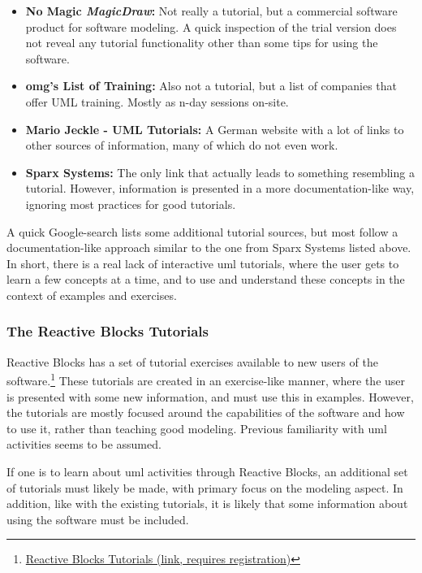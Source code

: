 \begin{itemize}
	\item{\textbf{No Magic \emph{MagicDraw}:}} Not really a tutorial, but a commercial software product for software modeling. A quick inspection of the trial version does not reveal any tutorial functionality other than some tips for using the software.
	\item{\textbf{\gls{omg}'s List of Training:}} Also not a tutorial, but a list of companies that offer UML training. Mostly as n-day sessions on-site.
	\item{\textbf{Mario Jeckle - UML Tutorials:}} A German website with a lot of links to other sources of information, many of which do not even work.
	\item{\textbf{Sparx Systems:}} The only link that actually leads to something resembling a tutorial. However, information is presented in a more documentation-like way, ignoring most practices for good tutorials.
\end{itemize}

\noindent
A quick Google-search lists some additional tutorial sources, but most follow a documentation-like approach similar to the one from Sparx Systems listed above. In short, there is a real lack of interactive \gls{uml} tutorials, where the user gets to learn a few concepts at a time, and to use and understand these concepts in the context of examples and exercises.

\subsubsection{The Reactive Blocks Tutorials}
Reactive Blocks has a set of tutorial exercises available to new users of the software.\footnote{\href{http://reference.bitreactive.com/tutorials/}{Reactive Blocks Tutorials (link, requires registration)}} These tutorials are created in an exercise-like manner, where the user is presented with some new information, and must use this in examples. However, the tutorials are mostly focused around the capabilities of the software and how to use it, rather than teaching good modeling. Previous familiarity with \gls{uml} activities seems to be assumed.

\noindent
If one is to learn about \gls{uml} activities through Reactive Blocks, an additional set of tutorials must likely be made, with primary focus on the modeling aspect. In addition, like with the existing tutorials, it is likely that some information about using the software must be included.

